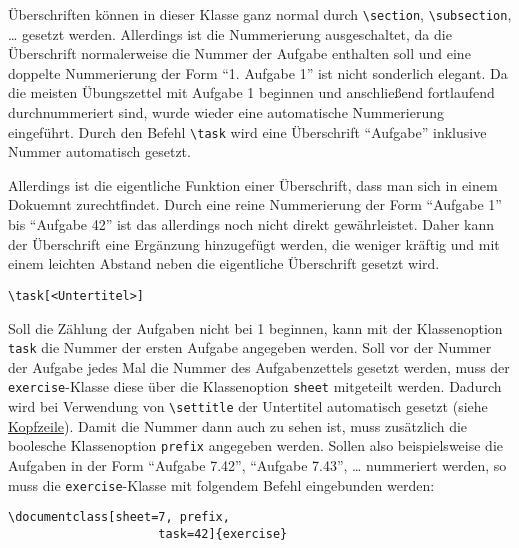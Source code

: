 \documentclass{exercise}
\begin{document}
  \label{section-aufgaben}
    Überschriften können in dieser Klasse ganz normal durch \lstinline{\section}, \lstinline{\subsection}, \ldots{} gesetzt werden. Allerdings ist die Nummerierung ausgeschaltet, da die Überschrift normalerweise die Nummer der Aufgabe enthalten soll und eine doppelte Nummerierung der Form \enquote{1. Aufgabe 1} ist nicht sonderlich elegant. Da die meisten Übungszettel mit Aufgabe 1 beginnen und anschließend fortlaufend durchnummeriert sind, wurde wieder eine automatische Nummerierung eingeführt. Durch den Befehl \lstinline-\task- wird eine Überschrift \enquote{Aufgabe} inklusive Nummer automatisch gesetzt.

    Allerdings ist die eigentliche Funktion einer Überschrift, dass man sich in einem Dokuemnt zurechtfindet. Durch eine reine Nummerierung der Form \enquote{Aufgabe 1} bis \enquote{Aufgabe 42} ist das allerdings noch nicht direkt gewährleistet. Daher kann der Überschrift eine Ergänzung hinzugefügt werden, die weniger kräftig und mit einem leichten Abstand neben die eigentliche Überschrift gesetzt wird.
    \begin{lstlisting}[gobble=6]
      \task[<Untertitel>]
    \end{lstlisting}

    Soll die Zählung der Aufgaben nicht bei 1 beginnen, kann mit der Klassenoption \texttt{task} die Nummer der ersten Aufgabe angegeben werden. Soll vor der Nummer der Aufgabe jedes Mal die Nummer des Aufgabenzettels gesetzt werden, muss der \texttt{exercise}-Klasse diese über die Klassenoption \lstinline{sheet} mitgeteilt werden. Dadurch wird bei Verwendung von \lstinline-\settitle- der Untertitel automatisch gesetzt (siehe \hyperref[section-kopfzeile]{Kopfzeile}). Damit die Nummer dann auch zu sehen ist, muss zusätzlich die boolesche Klassenoption \lstinline{prefix} angegeben werden. Sollen also beispielsweise die Aufgaben in der Form \enquote{Aufgabe 7.42}, \enquote{Aufgabe 7.43}, \ldots{} nummeriert werden, so muss die \texttt{exercise}-Klasse mit folgendem Befehl eingebunden werden:
    \begin{lstlisting}[gobble=6]
      \documentclass[sheet=7, prefix,
                     task=42]{exercise}
    \end{lstlisting}
\end{document}
